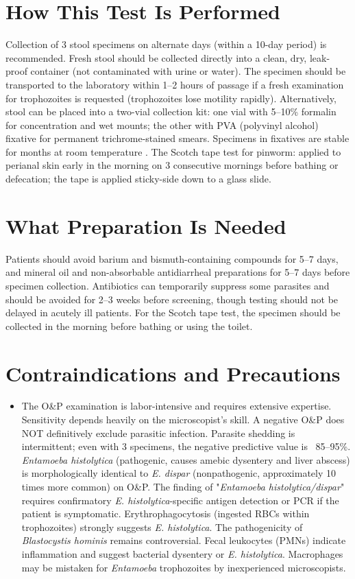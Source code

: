 \section*{How This Test Is Performed}
Collection of 3 stool specimens on alternate days (within a 10-day period) is recommended. Fresh stool should be collected directly into a clean, dry, leak-proof container (not contaminated with urine or water). The specimen should be transported to the laboratory within 1--2 hours of passage if a fresh examination for trophozoites is requested (trophozoites lose motility rapidly). Alternatively, stool can be placed into a two-vial collection kit: one vial with 5--10\% formalin for concentration and wet mounts; the other with PVA (polyvinyl alcohol) fixative for permanent trichrome-stained smears. Specimens in fixatives are stable for months at room temperature \cite{garcia2018practical}. The Scotch tape test for pinworm: applied to perianal skin early in the morning on 3 consecutive mornings before bathing or defecation; the tape is applied sticky-side down to a glass slide.

\section*{What Preparation Is Needed}
Patients should avoid barium and bismuth-containing compounds for 5--7 days, and mineral oil and non-absorbable antidiarrheal preparations for 5--7 days before specimen collection. Antibiotics can temporarily suppress some parasites and should be avoided for 2--3 weeks before screening, though testing should not be delayed in acutely ill patients. For the Scotch tape test, the specimen should be collected in the morning before bathing or using the toilet.

\section*{Contraindications and Precautions}
\begin{itemize}
  \item The O\&P examination is labor-intensive and requires extensive expertise. Sensitivity depends heavily on the microscopist's skill. A negative O\&P does NOT definitively exclude parasitic infection. Parasite shedding is intermittent; even with 3 specimens, the negative predictive value is ~85--95\%. \textit{Entamoeba histolytica} (pathogenic, causes amebic dysentery and liver abscess) is morphologically identical to \textit{E. dispar} (nonpathogenic, approximately 10 times more common) on O\&P. The finding of "\textit{Entamoeba histolytica/dispar}" requires confirmatory \textit{E. histolytica}-specific antigen detection or PCR if the patient is symptomatic. Erythrophagocytosis (ingested RBCs within trophozoites) strongly suggests \textit{E. histolytica}. The pathogenicity of \textit{Blastocystis hominis} remains controversial. Fecal leukocytes (PMNs) indicate inflammation and suggest bacterial dysentery or \textit{E. histolytica}. Macrophages may be mistaken for \textit{Entamoeba} trophozoites by inexperienced microscopists.
\end{itemize}
